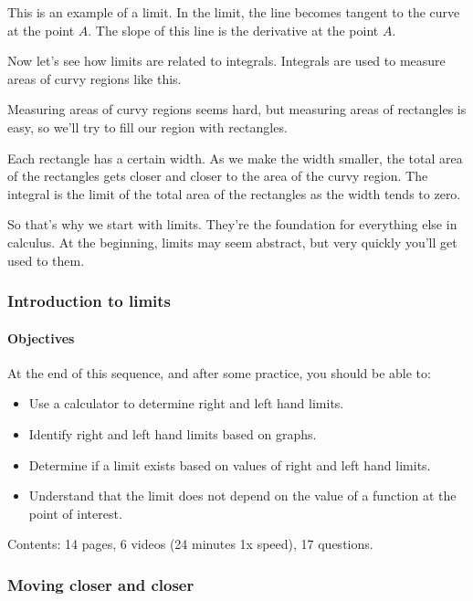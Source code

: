 \documentclass[pdftex, brazil, 12pt, twoside]{article}
\begin{document}
This is an example of a limit.
In the limit, the line becomes tangent to the curve
at the point $A$. The slope of this line
is the derivative at the point $A$.

Now let's see how limits
are related to integrals.
Integrals are used to measure areas of curvy regions
like this.

Measuring areas of curvy regions seems hard,
but measuring areas of rectangles
is easy, so we'll try to fill our region with rectangles.

Each rectangle has a certain width.
As we make the width smaller, the total area
of the rectangles gets closer and closer
to the area of the curvy region.
The integral is the limit of the total area of the rectangles
as the width tends to zero.

So that's why we start with limits.
They're the foundation for everything else in calculus.
At the beginning, limits may seem abstract,
but very quickly you'll get used to them.

\subsubsection{Introduction to limits}
\label{u0-intro-intro}

\paragraph{Objectives} At the end of this sequence, and after some practice, you should be able to:
\begin{itemize}[noitemsep]
\item Use a calculator to determine right and left hand limits.
\item Identify right and left hand limits based on graphs.
\item Determine if a limit exists based on values of right and left hand limits.
\item Understand that the limit does not depend on the value of a function at the point of interest.
\end{itemize}

Contents: 14 pages, 6 videos (24 minutes 1x speed), 17 questions.

\subsubsection{Moving closer and closer}
\label{u0-intro-moving}
\end{document}
